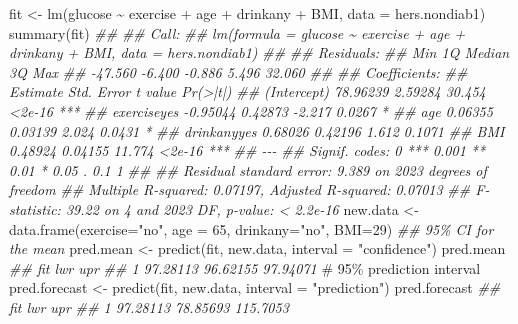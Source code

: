 \documentclass[
  letterpaper,
  DIV=11,
  numbers=noendperiod]{scrreprt}
\newenvironment{Shaded}{\begin{snugshade}}{\end{snugshade}}
\newcommand{\AttributeTok}[1]{\textcolor[rgb]{0.40,0.45,0.13}{#1}}
\newcommand{\CommentTok}[1]{\textcolor[rgb]{0.37,0.37,0.37}{#1}}
\newcommand{\DecValTok}[1]{\textcolor[rgb]{0.68,0.00,0.00}{#1}}
\newcommand{\DocumentationTok}[1]{\textcolor[rgb]{0.37,0.37,0.37}{\textit{#1}}}
\newcommand{\FunctionTok}[1]{\textcolor[rgb]{0.28,0.35,0.67}{#1}}
\newcommand{\NormalTok}[1]{\textcolor[rgb]{0.00,0.23,0.31}{#1}}
\newcommand{\OtherTok}[1]{\textcolor[rgb]{0.00,0.23,0.31}{#1}}
\newcommand{\SpecialCharTok}[1]{\textcolor[rgb]{0.37,0.37,0.37}{#1}}
\newcommand{\StringTok}[1]{\textcolor[rgb]{0.13,0.47,0.30}{#1}}
\begin{document}
\begin{Shaded}
\begin{Highlighting}[]
\NormalTok{fit }\OtherTok{\textless{}{-}} \FunctionTok{lm}\NormalTok{(glucose }\SpecialCharTok{\textasciitilde{}}\NormalTok{ exercise }\SpecialCharTok{+}\NormalTok{ age }\SpecialCharTok{+}\NormalTok{ drinkany }\SpecialCharTok{+}\NormalTok{ BMI, }\AttributeTok{data =}\NormalTok{ hers.nondiab1)}
\FunctionTok{summary}\NormalTok{(fit)}
\DocumentationTok{\#\# }
\DocumentationTok{\#\# Call:}
\DocumentationTok{\#\# lm(formula = glucose \textasciitilde{} exercise + age + drinkany + BMI, data = hers.nondiab1)}
\DocumentationTok{\#\# }
\DocumentationTok{\#\# Residuals:}
\DocumentationTok{\#\#     Min      1Q  Median      3Q     Max }
\DocumentationTok{\#\# {-}47.560  {-}6.400  {-}0.886   5.496  32.060 }
\DocumentationTok{\#\# }
\DocumentationTok{\#\# Coefficients:}
\DocumentationTok{\#\#             Estimate Std. Error t value Pr(\textgreater{}|t|)    }
\DocumentationTok{\#\# (Intercept) 78.96239    2.59284  30.454   \textless{}2e{-}16 ***}
\DocumentationTok{\#\# exerciseyes {-}0.95044    0.42873  {-}2.217   0.0267 *  }
\DocumentationTok{\#\# age          0.06355    0.03139   2.024   0.0431 *  }
\DocumentationTok{\#\# drinkanyyes  0.68026    0.42196   1.612   0.1071    }
\DocumentationTok{\#\# BMI          0.48924    0.04155  11.774   \textless{}2e{-}16 ***}
\DocumentationTok{\#\# {-}{-}{-}}
\DocumentationTok{\#\# Signif. codes:  0 \textquotesingle{}***\textquotesingle{} 0.001 \textquotesingle{}**\textquotesingle{} 0.01 \textquotesingle{}*\textquotesingle{} 0.05 \textquotesingle{}.\textquotesingle{} 0.1 \textquotesingle{} \textquotesingle{} 1}
\DocumentationTok{\#\# }
\DocumentationTok{\#\# Residual standard error: 9.389 on 2023 degrees of freedom}
\DocumentationTok{\#\# Multiple R{-}squared:  0.07197,    Adjusted R{-}squared:  0.07013 }
\DocumentationTok{\#\# F{-}statistic: 39.22 on 4 and 2023 DF,  p{-}value: \textless{} 2.2e{-}16}
\NormalTok{new.data }\OtherTok{\textless{}{-}} \FunctionTok{data.frame}\NormalTok{(}\AttributeTok{exercise=}\StringTok{"no"}\NormalTok{, }\AttributeTok{age =} \DecValTok{65}\NormalTok{, }\AttributeTok{drinkany=}\StringTok{"no"}\NormalTok{, }\AttributeTok{BMI=}\DecValTok{29}\NormalTok{)}
\DocumentationTok{\#\# 95\% CI for the mean }
\NormalTok{pred.mean }\OtherTok{\textless{}{-}} \FunctionTok{predict}\NormalTok{(fit, new.data, }\AttributeTok{interval =} \StringTok{"confidence"}\NormalTok{)}
\NormalTok{pred.mean}
\DocumentationTok{\#\#        fit      lwr      upr}
\DocumentationTok{\#\# 1 97.28113 96.62155 97.94071}
\CommentTok{\# 95\% prediction interval }
\NormalTok{pred.forecast }\OtherTok{\textless{}{-}} \FunctionTok{predict}\NormalTok{(fit, new.data, }\AttributeTok{interval =} \StringTok{"prediction"}\NormalTok{)}
\NormalTok{pred.forecast}
\DocumentationTok{\#\#        fit      lwr      upr}
\DocumentationTok{\#\# 1 97.28113 78.85693 115.7053}
\end{Highlighting}
\end{Shaded}
\end{document}
